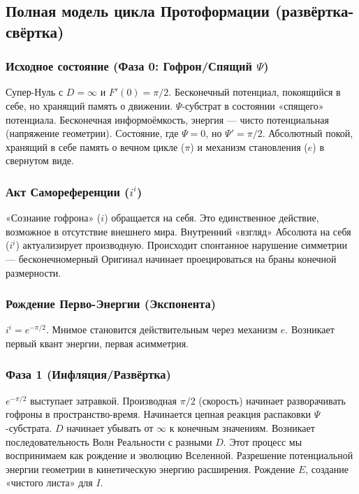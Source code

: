 \documentclass[a4paper,12pt]{article}
\begin{document}
\subsection{Полная модель цикла Протоформации (развёртка-свёртка)}

\subsubsection{Исходное состояние (Фаза 0: Гофрон/Спящий $\Psi$)}

Супер-Нуль с $D = \infty$ и $F'(0) = \pi/2$. Бесконечный потенциал, покоящийся в себе, но хранящий память о движении. $\Psi$-субстрат в состоянии «спящего» потенциала. Бесконечная информоёмкость, энергия — чисто потенциальная (напряжение геометрии). Состояние, где $\Psi = 0$, но $\Psi' = \pi/2$. Абсолютный покой, хранящий в себе память о вечном цикле ($\pi$) и механизм становления ($e$) в свернутом виде.

\subsubsection{Акт Самореференции ($i^i$)}

«Сознание гофрона» ($i$) обращается на себя. Это единственное действие, возможное в отсутствие внешнего мира. Внутренний «взгляд» Абсолюта на себя ($i^i$) актуализирует производную. Происходит спонтанное нарушение симметрии — бесконечномерный Оригинал начинает проецироваться на браны конечной размерности.

\subsubsection{Рождение Перво-Энергии (Экспонента)}

$i^i = e^{-\pi/2}$. Мнимое становится действительным через механизм $e$. Возникает первый квант энергии, первая асимметрия.

\subsubsection{Фаза 1 (Инфляция/Развёртка)}

$e^{-\pi/2}$ выступает затравкой. Производная $\pi/2$ (скорость) начинает разворачивать гофроны в пространство-время. Начинается цепная реакция распаковки $\Psi$-субстрата. $D$ начинает убывать от $\infty$ к конечным значениям. Возникает последовательность Волн Реальности с разными $D$. Этот процесс мы воспринимаем как рождение и эволюцию Вселенной. Разрешение потенциальной энергии геометрии в кинетическую энергию расширения. Рождение $E$, создание «чистого листа» для $I$.
\end{document}
